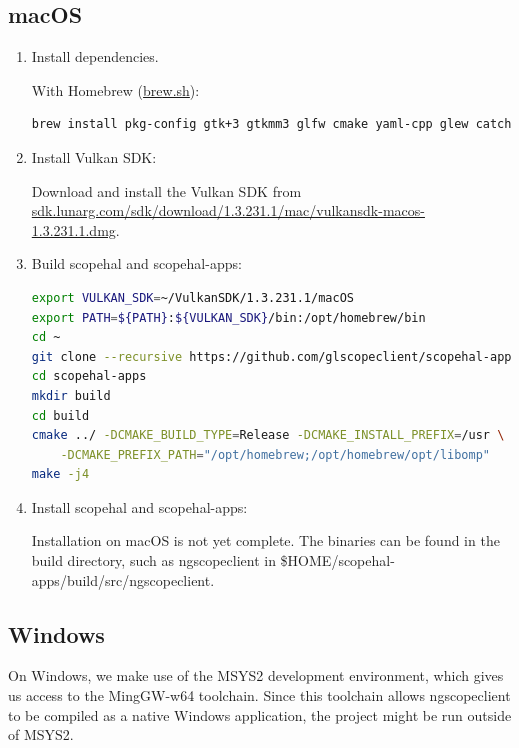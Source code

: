 \subsection{macOS}
\begin{enumerate}

\item Install dependencies.

With Homebrew (\href{https://brew.sh}{brew.sh}):

\begin{lstlisting}[language=sh, numbers=none]
brew install pkg-config gtk+3 gtkmm3 glfw cmake yaml-cpp glew catch2 libomp
\end{lstlisting}

\item Install Vulkan SDK:

Download and install the Vulkan SDK from \href{https://sdk.lunarg.com/sdk/download/1.3.231.1/mac/vulkansdk-macos-1.3.231.1.dmg}{sdk.lunarg.com/sdk/download/1.3.231.1/mac/vulkansdk-macos-1.3.231.1.dmg}.

\item Build scopehal and scopehal-apps:

\begin{lstlisting}[language=sh, numbers=none]
export VULKAN_SDK=~/VulkanSDK/1.3.231.1/macOS
export PATH=${PATH}:${VULKAN_SDK}/bin:/opt/homebrew/bin
cd ~
git clone --recursive https://github.com/glscopeclient/scopehal-apps.git
cd scopehal-apps
mkdir build
cd build
cmake ../ -DCMAKE_BUILD_TYPE=Release -DCMAKE_INSTALL_PREFIX=/usr \
	-DCMAKE_PREFIX_PATH="/opt/homebrew;/opt/homebrew/opt/libomp"
make -j4
\end{lstlisting}

\item Install scopehal and scopehal-apps:

Installation on macOS is not yet complete.
The binaries can be found in the build directory, such as ngscopeclient in \$HOME/scopehal-apps/build/src/ngscopeclient.

\end{enumerate}

\subsection{Windows}

On Windows, we make use of the MSYS2 development environment, which gives us access to the MingGW-w64 toolchain.
Since this toolchain allows ngscopeclient to be compiled as a native Windows application, the project might be run
outside of MSYS2.

